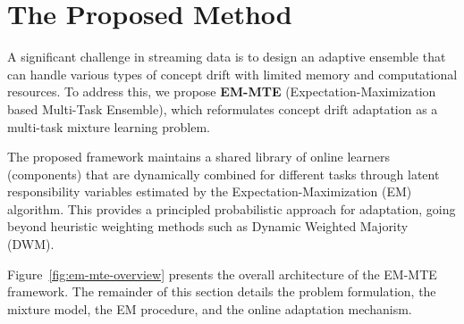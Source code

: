 \documentclass[12pt,a4paper]{article}
\begin{document}
	
	
	
	

	
	
	
\section{The Proposed Method}
\label{sec:proposed}

A significant challenge in streaming data is to design an adaptive ensemble that can handle various types of concept drift with limited memory and computational resources. To address this, we propose \textbf{EM-MTE} (Expectation-Maximization based Multi-Task Ensemble), which reformulates concept drift adaptation as a multi-task mixture learning problem.

The proposed framework maintains a shared library of online learners (components) that are dynamically combined for different tasks through latent responsibility variables estimated by the Expectation-Maximization (EM) algorithm. This provides a principled probabilistic approach for adaptation, going beyond heuristic weighting methods such as Dynamic Weighted Majority (DWM).

Figure~\ref{fig:em-mte-overview} presents the overall architecture of the EM-MTE framework. The remainder of this section details the problem formulation, the mixture model, the EM procedure, and the online adaptation mechanism.
\end{document}
